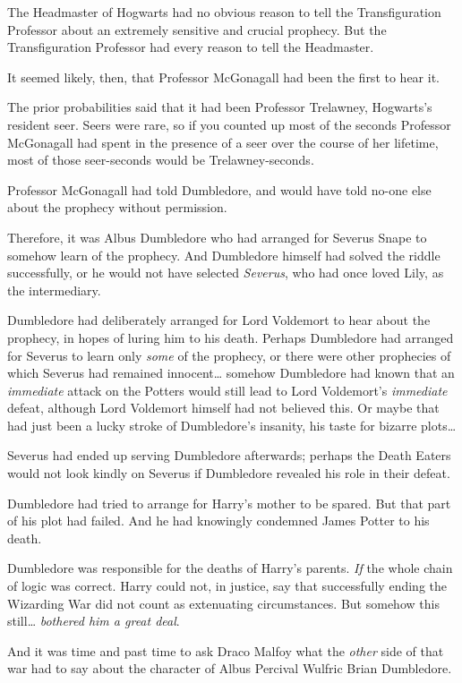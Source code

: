 The Headmaster of Hogwarts had no obvious reason to tell the Transfiguration Professor about an extremely sensitive and crucial prophecy. But the Transfiguration Professor had every reason to tell the Headmaster.

It seemed likely, then, that Professor McGonagall had been the first to hear it.

The prior probabilities said that it had been Professor Trelawney, Hogwarts's resident seer. Seers were rare, so if you counted up most of the seconds Professor McGonagall had spent in the presence of a seer over the course of her lifetime, most of those seer-seconds would be Trelawney-seconds.

Professor McGonagall had told Dumbledore, and would have told no-one else about the prophecy without permission.

Therefore, it was Albus Dumbledore who had arranged for Severus Snape to somehow learn of the prophecy. And Dumbledore himself had solved the riddle successfully, or he would not have selected \emph{Severus}, who had once loved Lily, as the intermediary.

Dumbledore had deliberately arranged for Lord Voldemort to hear about the prophecy, in hopes of luring him to his death. Perhaps Dumbledore had arranged for Severus to learn only \emph{some} of the prophecy, or there were other prophecies of which Severus had remained innocent{\ldots} somehow Dumbledore had known that an \emph{immediate} attack on the Potters would still lead to Lord Voldemort's \emph{immediate} defeat, although Lord Voldemort himself had not believed this. Or maybe that had just been a lucky stroke of Dumbledore's insanity, his taste for bizarre plots{\ldots}

Severus had ended up serving Dumbledore afterwards; perhaps the Death Eaters would not look kindly on Severus if Dumbledore revealed his role in their defeat.

Dumbledore had tried to arrange for Harry's mother to be spared. But that part of his plot had failed. And he had knowingly condemned James Potter to his death.

Dumbledore was responsible for the deaths of Harry's parents. \emph{If} the whole chain of logic was correct. Harry could not, in justice, say that successfully ending the Wizarding War did not count as extenuating circumstances. But somehow this still{\ldots} \emph{bothered him a great deal}.

And it was time and past time to ask Draco Malfoy what the \emph{other} side of that war had to say about the character of Albus Percival Wulfric Brian Dumbledore.


